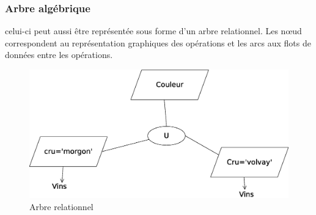 \documentclass[12pt,a4paper,openany]{book}
\begin{document}
	\subsubsection{Arbre algébrique}
	celui-ci peut aussi être représentée sous forme d'un arbre relationnel. Les n\oe{}ud correspondent au représentation graphiques des opérations et
	les arcs aux flots de données entre les opérations.
	\begin{figure}[H]
		\centering
		\includegraphics[width=15cm]{arbreRelationnel.eps}
		\caption{Arbre relationnel}
	\end{figure}

	\appendix
	
\end{document}
